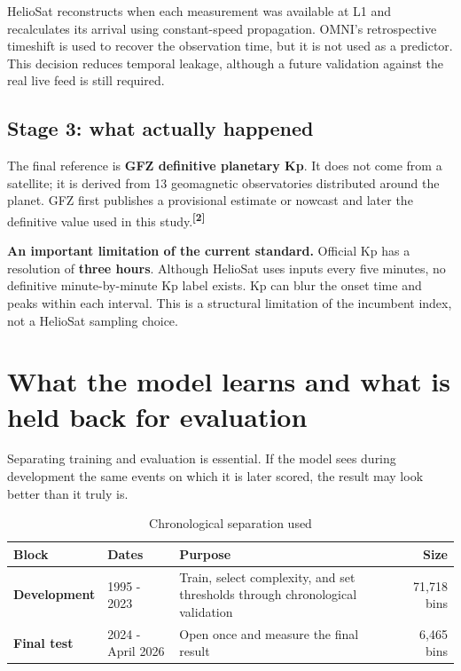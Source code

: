 \documentclass[10pt,a4paper]{article}
\let\plainsection\section
\renewcommand{\section}[1]{\plainsection{\color{Navy}#1}}
\let\plainsubsection\subsection
\renewcommand{\subsection}[1]{\plainsubsection{\color{Ink}#1}}
\newenvironment{warningbox}{\begin{center}\setlength{\fboxsep}{4mm}\begin{lrbox}{\warningsave}\begin{minipage}{0.90\textwidth}}{\end{minipage}\end{lrbox}\colorbox{AmberSoft}{\usebox{\warningsave}}\end{center}}
\newcommand{\source}[1]{\textsuperscript{\color{Cyan}\textbf{[#1]}}}
\begin{document}
HelioSat reconstructs when each measurement was available at L1 and recalculates its arrival using constant-speed propagation. OMNI's retrospective timeshift is used to recover the observation time, but it is not used as a predictor. This decision reduces temporal leakage, although a future validation against the real live feed is still required.

\subsection{Stage 3: what actually happened}

The final reference is \textbf{GFZ definitive planetary Kp}. It does not come from a satellite; it is derived from 13 geomagnetic observatories distributed around the planet. GFZ first publishes a provisional estimate or nowcast and later the definitive value used in this study.\source{2}

\begin{warningbox}
\textbf{An important limitation of the current standard.} Official Kp has a resolution of \textbf{three hours}. Although HelioSat uses inputs every five minutes, no definitive minute-by-minute Kp label exists. Kp can blur the onset time and peaks within each interval. This is a structural limitation of the incumbent index, not a HelioSat sampling choice.
\end{warningbox}

\section{What the model learns and what is held back for evaluation}

Separating training and evaluation is essential. If the model sees during development the same events on which it is later scored, the result may look better than it truly is.

\begin{table}[H]
\centering
\caption*{Chronological separation used}
\begin{tabularx}{\textwidth}{>{\bfseries}p{31mm}p{34mm}Xr}
\toprule
Block & Dates & Purpose & Size\\
\midrule
Development & 1995 - 2023 & Train, select complexity, and set thresholds through chronological validation & 71,718 bins\\
Final test & 2024 - April 2026 & Open once and measure the final result & 6,465 bins\\
\bottomrule
\end{tabularx}
\end{table}
\end{document}
